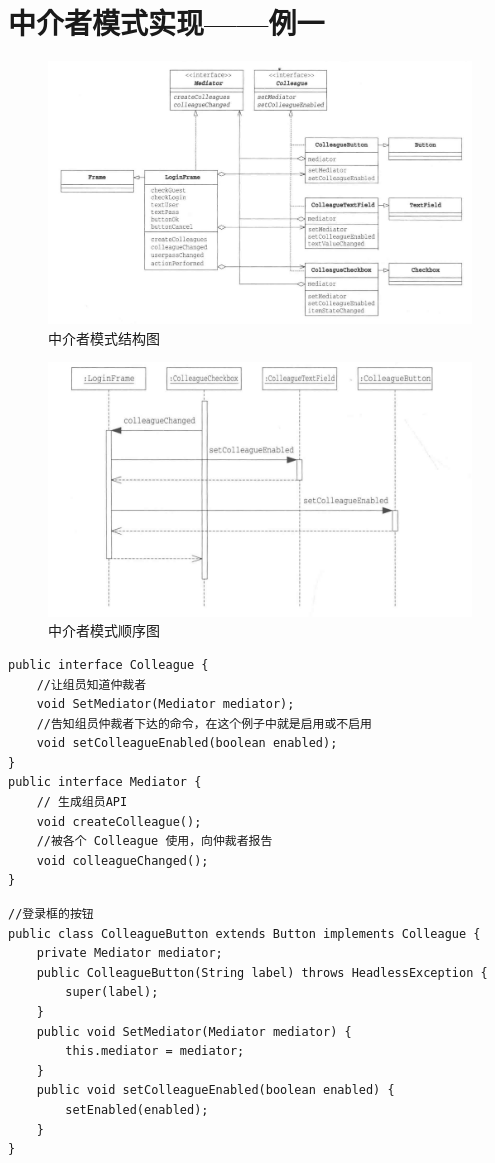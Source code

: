 \section{中介者模式实现——例一}
\begin{figure}[!h]
	\centering
	\includegraphics[width=\textwidth]{image/16-1}
	\caption{中介者模式结构图}
\end{figure}
\begin{figure}[!h]
	\centering
	\includegraphics[width=\textwidth]{image/16-2}
	\caption{中介者模式顺序图}
\end{figure}
\begin{lstlisting}
public interface Colleague {
	//让组员知道仲裁者
	void SetMediator(Mediator mediator);
	//告知组员仲裁者下达的命令，在这个例子中就是启用或不启用
	void setColleagueEnabled(boolean enabled);
}
public interface Mediator {
	// 生成组员API
	void createColleague();
	//被各个 Colleague 使用，向仲裁者报告
	void colleagueChanged();
}
\end{lstlisting}
\begin{lstlisting}
//登录框的按钮
public class ColleagueButton extends Button implements Colleague {
	private Mediator mediator;
	public ColleagueButton(String label) throws HeadlessException {
		super(label);
	}
	public void SetMediator(Mediator mediator) {
		this.mediator = mediator;
	}
	public void setColleagueEnabled(boolean enabled) {
		setEnabled(enabled);
	}
}
\end{lstlisting}
